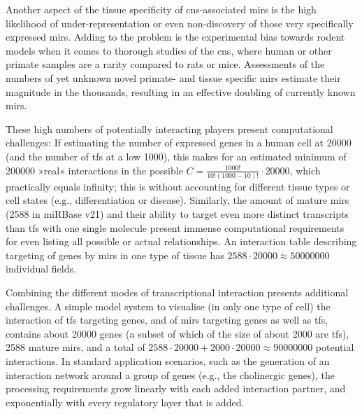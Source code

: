 Another aspect of the tissue specificity of \ac{cns}-associated \acp{mir} is the high likelihood of under-representation or even non-discovery of those very specifically expressed \acp{mir}. Adding to the problem is the experimental bias towards rodent models when it comes to thorough studies of the \ac{cns}, where human or other primate samples are a rarity compared to rats or mice. Assessments of the numbers of yet unknown novel primate- and tissue specific \acp{mir} estimate their magnitude in the thousands,\cite{Londin2015} resulting in an effective doubling of currently known \acp{mir}.

These high numbers of potentially interacting players present computational challenges: If estimating the number of expressed genes in a human cell at \num{20000} (and the number of \acp{tf} at a low 1000), this makes for an estimated minimum of \num{200000} »real« interactions in the possible $ C = \frac{1000!}{10!(1000-10)!} \cdot \num{20000} $, which practically equals infinity; this is without accounting for different tissue types or cell states (e.g., differentiation or disease). Similarly, the amount of mature \acp{mir} (2588 in miRBase v21) and their ability to target even more distinct transcripts than \acp{tf} with one single molecule present immense computational requirements for even listing all possible or actual relationships. An interaction table describing targeting of genes by \acp{mir} in one type of tissue has $ 2588 \cdot \num{20000} \approx \num{50000000} $ individual fields.

Combining the different modes of transcriptional interaction presents additional challenges. A simple model system to visualise (in only one type of cell) the interaction of \acp{tf} targeting genes, and of \acp{mir} targeting genes as well as \acp{tf}, contains about \num{20000} genes (a subset of which of the size of about 2000 are \acp{tf}), 2588 mature \acp{mir}, and a total of $ 2588 \cdot \num{20000} + 2000 \cdot \num{20000} \approx \num{90000000} $ potential interactions. In standard application scenarios, such as the generation of an interaction network around a group of genes (e.g., the cholinergic genes), the processing requirements grow linearly with each added interaction partner, and exponentially with every regulatory layer that is added. 

